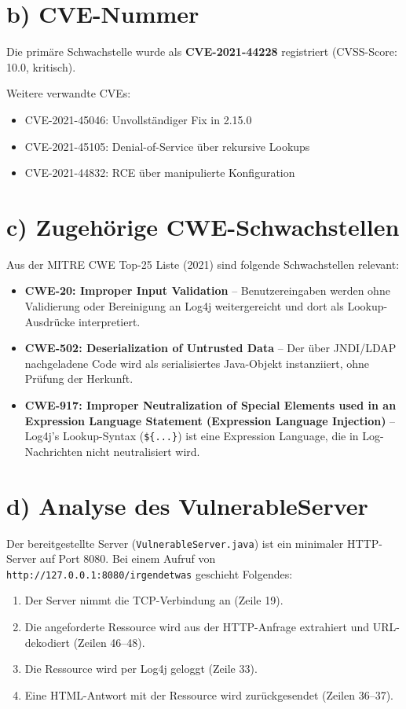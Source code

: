 \documentclass[
	fontsize=12pt,
	paper=a4,
	numbers=noenddot,
	listof=totoc,
	listof=entryprefix,
	listof=nochaptergap,
	bibliography=totoc,
	parskip=half,
	openany
]{scrbook}
\begin{document}
\section*{b) CVE-Nummer}

Die primäre Schwachstelle wurde als \textbf{CVE-2021-44228} registriert (CVSS-Score: 10.0, kritisch).

Weitere verwandte CVEs:
\begin{itemize}
	\item CVE-2021-45046: Unvollständiger Fix in 2.15.0
	\item CVE-2021-45105: Denial-of-Service über rekursive Lookups
	\item CVE-2021-44832: RCE über manipulierte Konfiguration
\end{itemize}

\section*{c) Zugehörige CWE-Schwachstellen}

Aus der MITRE CWE Top-25 Liste (2021) sind folgende Schwachstellen relevant:

\begin{itemize}
	\item \textbf{CWE-20: Improper Input Validation} -- Benutzereingaben werden ohne Validierung oder Bereinigung an Log4j weitergereicht und dort als Lookup-Ausdrücke interpretiert.
	\item \textbf{CWE-502: Deserialization of Untrusted Data} -- Der über JNDI/LDAP nachgeladene Code wird als serialisiertes Java-Objekt instanziiert, ohne Prüfung der Herkunft.
	\item \textbf{CWE-917: Improper Neutralization of Special Elements used in an Expression Language Statement (Expression Language Injection)} -- Log4j's Lookup-Syntax (\texttt{\$\{...\}}) ist eine Expression Language, die in Log-Nachrichten nicht neutralisiert wird.
\end{itemize}

\section*{d) Analyse des VulnerableServer}

Der bereitgestellte Server (\texttt{VulnerableServer.java}) ist ein minimaler HTTP-Server auf Port 8080.
Bei einem Aufruf von \texttt{http://127.0.0.1:8080/irgendetwas} geschieht Folgendes:

\begin{enumerate}
	\item Der Server nimmt die TCP-Verbindung an (Zeile 19).
	\item Die angeforderte Ressource wird aus der HTTP-Anfrage extrahiert und URL-dekodiert (Zeilen 46--48).
	\item Die Ressource wird per Log4j geloggt (Zeile 33).
	\item Eine HTML-Antwort mit der Ressource wird zurückgesendet (Zeilen 36--37).
\end{enumerate}
\end{document}
